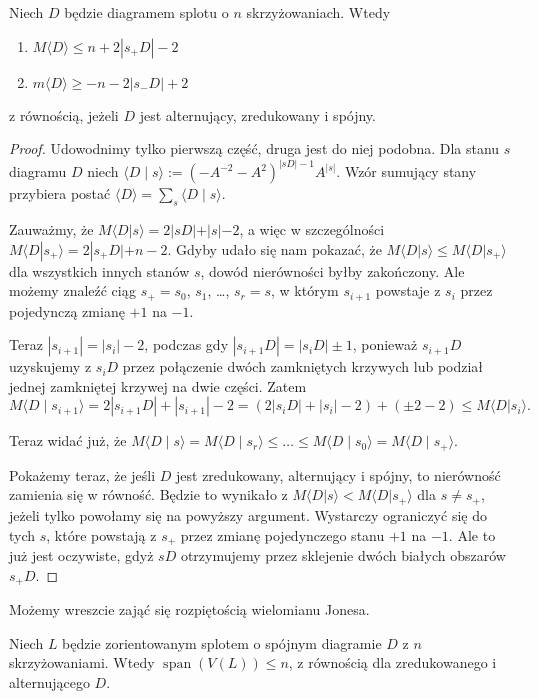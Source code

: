 \begin{lemat}
Niech $D$ będzie diagramem splotu o $n$ skrzyżowaniach.
Wtedy
\begin{enumerate}
\item $M \langle D \rangle \le n+2|s_+D|-2$
\item $m \langle D \rangle \ge -n-2|s_-D|+2$
\end{enumerate}
z równością, jeżeli $D$ jest alternujący, zredukowany i spójny.
\end{lemat}

\begin{proof}
Udowodnimy tylko pierwszą część, druga jest do niej podobna.
Dla stanu $s$ diagramu $D$ niech $\langle D \mid s\rangle :=(-A^{-2}-A^2)^{|sD|-1}A^{|s|}$.
Wzór sumujący stany przybiera postać $\langle D\rangle = \sum_s \langle D \mid s\rangle$.

Zauważmy, że $M\langle D|s\rangle=2|sD|+|s|-2$, a więc w szczególności $M\langle D|s_+\rangle=2|s_+D|+n-2$.
Gdyby udało się nam pokazać, że $M\langle D|s\rangle \le M\langle D|s_+\rangle$ dla wszystkich innych stanów $s$, dowód nierówności byłby zakończony.
Ale możemy znaleźć ciąg $s_+ = s_0$, $s_1$, \ldots, $s_r=s$, w którym $s_{i+1}$ powstaje z $s_i$ przez pojedynczą zmianę $+1$ na $-1$.

Teraz $|s_{i+1}|=|s_i|-2$, podczas gdy $|s_{i+1}D|=|s_iD|\pm 1$, ponieważ $s_{i+1}D$ uzyskujemy z $s_{i}D$ przez połączenie dwóch zamkniętych krzywych lub podział jednej zamkniętej krzywej na dwie części.
Zatem
\[
	M \langle D \mid s_{i+1} \rangle =
	2|s_{i+1}D|+|s_{i+1}|-2 =
	(2|s_iD| + |s_i| -2 ) + (\pm 2-2) \le
	M \langle D|s_i\rangle.
\]

Teraz widać już, że $M\langle D \mid s\rangle =M\langle D \mid s_r\rangle \le\ldots\le M\langle D \mid s_0\rangle=M\langle D \mid s_+\rangle$.

Pokażemy teraz, że jeśli $D$ jest zredukowany, alternujący i spójny, to nierówność zamienia się w równość.
Będzie to wynikało z  $M\langle D|s\rangle<M\langle D| s_+\rangle$
dla $s\neq s_+$, jeżeli tylko powołamy się na powyższy argument.
Wystarczy ograniczyć się do tych $s$, które powstają z $s_+$ przez zmianę pojedynczego stanu $+1$ na $-1$.
Ale to już jest oczywiste, gdyż $sD$ otrzymujemy przez sklejenie dwóch białych obszarów $s_+ D$.
\end{proof}

Możemy wreszcie zająć się rozpiętością wielomianu Jonesa.

\begin{twierdzenie}
Niech $L$ będzie zorientowanym splotem o spójnym diagramie $D$ z $n$ skrzyżowaniami.
Wtedy $\operatorname{span}(V(L)) \le n$, z równością dla zredukowanego i alternującego $D$.
\end{twierdzenie}


